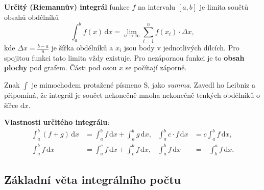 \begin{center}
\end{center}

\begin{definitionbox}
  \textbf{Určitý (Riemannův) integrál} funkce $f$ na intervalu $[a, b]$ je limita součtů obsahů obdélníků
  \begin{equation*}
    \int_a^b f(x)\,\mathrm{d}x = \lim_{n\to\infty}\sum_{i=1}^{n}f(x_i)\cdot\Delta x,
  \end{equation*}
  kde $\Delta x = \frac{b - a}{n}$ je šířka obdélníků a $x_i$ jsou body v jednotlivých dílcích. Pro spojitou funkci tato limita vždy existuje. Pro nezápornou funkci je to \textbf{obsah plochy} pod grafem. Části pod osou $x$ se počítají záporně.
\end{definitionbox}

Znak $\int$ je mimochodem protažené písmeno S, jako \textit{summa}. Zavedl ho Leibniz a připomíná, že integrál je součet nekonečně mnoha nekonečně tenkých obdélníků o šířce $\mathrm{d}x$.

\begin{definitionbox}
  \textbf{Vlastnosti určitého integrálu}:
  \begin{align*}
    \int_a^b(f + g)\,\mathrm{d}x &= \int_a^b f\,\mathrm{d}x + \int_a^b g\,\mathrm{d}x, & \int_a^b c\cdot f\,\mathrm{d}x &= c\int_a^b f\,\mathrm{d}x,\\
    \int_a^b f\,\mathrm{d}x &= \int_a^c f\,\mathrm{d}x + \int_c^b f\,\mathrm{d}x, & \int_a^b f\,\mathrm{d}x &= -\int_b^a f\,\mathrm{d}x.
  \end{align*}
\end{definitionbox}

\subsection{Základní věta integrálního počtu}\label{sec:zvip}

